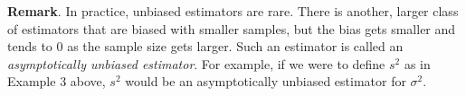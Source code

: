 \documentclass[12pt]{article}
\begin{document}
\textbf{Remark}.  In practice, unbiased estimators are rare.  There is another, larger class of estimators that are biased with smaller samples, but the bias gets smaller and tends to 0 as the sample size gets larger.  Such an estimator is called an \emph{asymptotically unbiased estimator}.  For example, if we were to define $s^2$ as in Example 3 above, $s^2$ would be an asymptotically unbiased estimator for $\sigma^2$.
\end{document}
